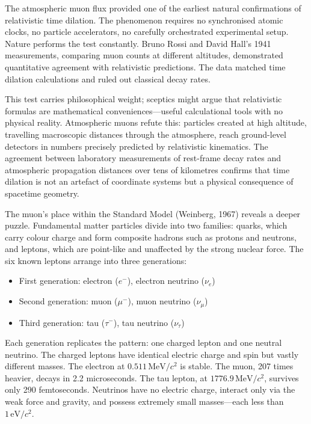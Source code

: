 The atmospheric muon flux provided one of the earliest natural confirmations of relativistic time dilation. The phenomenon requires no synchronised atomic clocks, no particle accelerators, no carefully orchestrated experimental setup. Nature performs the test constantly. Bruno Rossi and David Hall's 1941 measurements, comparing muon counts at different altitudes, demonstrated quantitative agreement with relativistic predictions. The data matched time dilation calculations and ruled out classical decay rates.

This test carries philosophical weight; sceptics might argue that relativistic formulas are mathematical conveniences—useful calculational tools with no physical reality. Atmospheric muons refute this: particles created at high altitude, travelling macroscopic distances through the atmosphere, reach ground-level detectors in numbers precisely predicted by relativistic kinematics. The agreement between laboratory measurements of rest-frame decay rates and atmospheric propagation distances over tens of kilometres confirms that time dilation is not an artefact of coordinate systems but a physical consequence of spacetime geometry.

The muon's place within the Standard Model (Weinberg, 1967) reveals a deeper puzzle. Fundamental matter particles divide into two families: quarks, which carry colour charge and form composite hadrons such as protons and neutrons, and leptons, which are point-like and unaffected by the strong nuclear force. The six known leptons arrange into three generations:
\begin{itemize}
\item First generation: electron ($e^-$), electron neutrino ($\nu_e$)
\item Second generation: muon ($\mu^-$), muon neutrino ($\nu_\mu$)
\item Third generation: tau ($\tau^-$), tau neutrino ($\nu_\tau$)
\end{itemize}

Each generation replicates the pattern: one charged lepton and one neutral neutrino. The charged leptons have identical electric charge and spin but vastly different masses. The electron at $0.511\,\text{MeV}/c^2$ is stable. The muon, 207 times heavier, decays in 2.2 microseconds. The tau lepton, at $1776.9\,\text{MeV}/c^2$, survives only 290 femtoseconds. Neutrinos have no electric charge, interact only via the weak force and gravity, and possess extremely small masses—each less than $1\,\text{eV}/c^2$.

